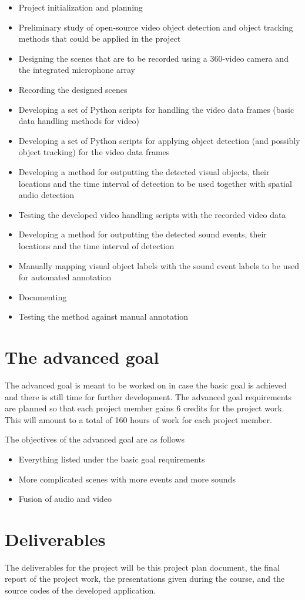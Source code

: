 \begin{itemize}
	\item Project initialization and planning
	\item Preliminary study of open-source video object detection and object tracking methods that could be applied in the project
	\item Designing the scenes that are to be recorded using a 360-video camera and the integrated microphone array
	\item Recording the designed scenes
	\item Developing a set of Python scripts for handling the video data frames (basic data handling methods for video)
	\item Developing a set of Python scripts for applying object detection (and possibly object tracking) for the video data frames
	\item Developing a method for outputting the detected visual objects, their locations and the time interval of detection to be used together with spatial audio detection
	\item Testing the developed video handling scripts with the recorded video data
	\item Developing a method for outputting the detected sound events, their locations and the time interval of detection
	\item Manually mapping visual object labels with the sound event labels to be used for automated annotation
	\item Documenting
	\item Testing the method against manual annotation
\end{itemize} 

\section{The advanced goal}

The advanced goal is meant to be worked on in case the basic goal is achieved and there is still time for further development. The advanced goal requirements are planned so that each project member gains 6 credits for the project work. This will amount to a total of 160 hours of work for each project member. 

The objectives of the advanced goal are as follows

\begin{itemize}
	\item Everything listed under the basic goal requirements
	\item More complicated scenes with more events and more sounds
	\item Fusion of audio and video
\end{itemize} 


\section{Deliverables}

The deliverables for the project will be this project plan document, the final report of the project work, the presentations given during the course, and the source codes of the developed application.